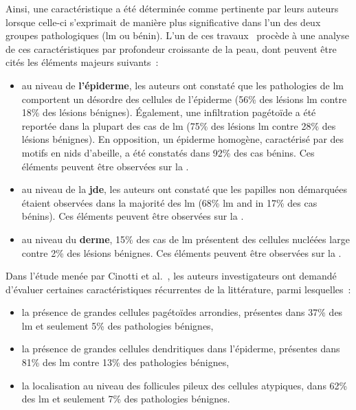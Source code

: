 Ainsi, une caractéristique a été déterminée comme pertinente par leurs auteurs lorsque celle-ci s'exprimait de manière plus significative dans l'un des deux groupes pathologiques (\gls{lm} ou bénin). L'un de ces travaux~\cite{Guitera2010} procède à une analyse de ces caractéristiques par profondeur croissante de la peau, dont peuvent être cités les éléments majeurs suivants~:
\begin{itemize}
    \item au niveau de \textbf{l'épiderme}, les auteurs ont constaté que les pathologies de \gls{lm} comportent un désordre des cellules de l'épiderme (56\% des lésions \gls{lm} contre 18\% des lésions bénignes). Également, une infiltration pagétoïde a été reportée dans la plupart des cas de \gls{lm} (75\% des lésions \gls{lm} contre 28\% des lésions bénignes). En opposition, un épiderme homogène, caractérisé par des motifs en nids d'abeille, a été constatés dans 92\% des cas bénins. Ces éléments peuvent être observées sur la .
    \item au niveau de la \textbf{\gls{jde}}, les auteurs ont constaté que les papilles non démarquées étaient observées dans la majorité des \gls{lm} (68\% \gls{lm} and in 17\% des cas bénins). Ces éléments peuvent être observées sur la  .
    \item au niveau du \textbf{derme}, 15\% des cas de \gls{lm} présentent des cellules nucléées large contre 2\% des lésions bénignes. Ces éléments peuvent être observées sur la .
\end{itemize}\par

Dans l'étude menée par Cinotti et al.~\cite{Cinotti2018}, les auteurs investigateurs ont demandé d'évaluer certaines caractéristiques récurrentes de la littérature, parmi lesquelles~:
\begin{itemize}
    \item la présence de grandes cellules pagétoïdes arrondies, présentes dans 37\% des \gls{lm} et seulement 5\% des pathologies bénignes,
    \item la présence de grandes cellules dendritiques dans l'épiderme, présentes dans 81\% des \gls{lm} contre 13\% des pathologies bénignes,
    \item la localisation au niveau des follicules pileux des cellules atypiques, dans 62\% des \gls{lm} et seulement 7\% des pathologies bénignes.
\end{itemize}\par

